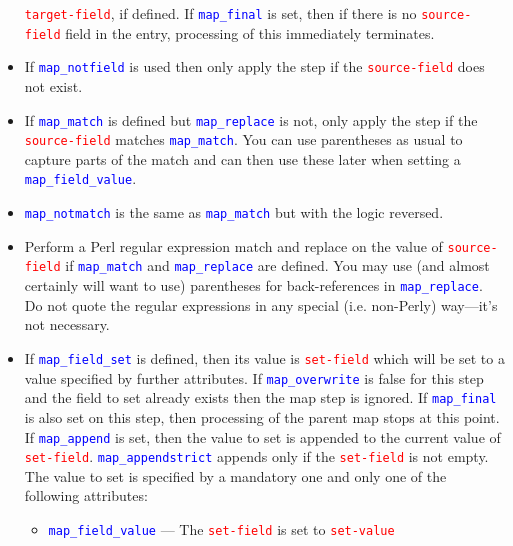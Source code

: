 \documentclass{ltxdockit}
\begin{document}
\begin{itemize}
  \textcolor{red}{\texttt{target-field}}, if defined. If
  \textcolor{blue}{\texttt{map\_final}} is set, then if there is no
  \textcolor{red}{\texttt{source-field}} field in the entry, processing of
  this  immediately terminates.
\item If \textcolor{blue}{\texttt{map\_notfield}} is used then only apply
  the step if the \textcolor{red}{\texttt{source-field}} does not exist.
\item If \textcolor{blue}{\texttt{map\_match}} is defined but
  \textcolor{blue}{\texttt{map\_replace}} is not, only apply the
  step if the \textcolor{red}{\texttt{source-field}} matches
  \textcolor{blue}{\texttt{map\_match}}. You can use parentheses as usual
  to capture parts of the match and can then use these later when setting a \textcolor{blue}{\texttt{map\_field\_value}}.
\item \textcolor{blue}{\texttt{map\_notmatch}} is the same as
  \textcolor{blue}{\texttt{map\_match}} but with the logic reversed.
\item Perform a Perl regular expression match and replace on the value of
  \textcolor{red}{\texttt{source-field}} if
  \textcolor{blue}{\texttt{map\_match}} and
  \textcolor{blue}{\texttt{map\_replace}} are defined. You may use (and almost certainly
  will want to use) parentheses for back-references in \textcolor{blue}{\texttt{map\_replace}}.
  Do not quote the regular expressions in any special (i.e. non-Perly) way---it's not
  necessary.
\item If \textcolor{blue}{\texttt{map\_field\_set}} is defined, then its
  value is \textcolor{red}{\texttt{set-field}} which will be set to a value
  specified by further attributes. If
  \textcolor{blue}{\texttt{map\_overwrite}} is false for this step and the
  field to set already exists then the map step is ignored. If
  \textcolor{blue}{\texttt{map\_final}} is also set on this step, then
  processing of the parent map stops at this point. If
  \textcolor{blue}{\texttt{map\_append}} is set, then the value to set is
  appended to the current value of \textcolor{red}{\texttt{set-field}}.
  \textcolor{blue}{\texttt{map\_appendstrict}} appends only if the
  \textcolor{red}{\texttt{set-field}} is not empty. The value to set is
  specified by a mandatory one and only one of the following attributes:
  \begin{itemize}
    \item \textcolor{blue}{\texttt{map\_field\_value}} --- The
      \textcolor{red}{\texttt{set-field}} is set to
      \textcolor{red}{\texttt{set-value}}

\end{itemize}
\end{itemize}
\end{document}
